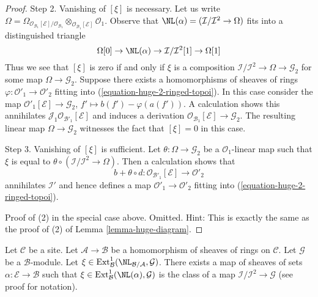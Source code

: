 \begin{proof}
\medskip\noindent
Step 2. Vanishing of $[\xi]$ is necessary. Let us write $\Omega =
\Omega_{\mathcal{O}_{\mathcal{B}_1}[\mathcal{E}]/\mathcal{O}_{\mathcal{B}_1}}
\otimes_{\mathcal{O}_{\mathcal{B}_1}[\mathcal{E}]} \mathcal{O}_1$.
Observe that $\NL(\alpha) = (\mathcal{I}/\mathcal{I}^2 \to \Omega)$
fits into a distinguished triangle
$$
\Omega[0] \to
\NL(\alpha) \to
\mathcal{I}/\mathcal{I}^2[1] \to
\Omega[1]
$$
Thus we see that $[\xi]$ is zero if and only if $\xi$
is a composition $\mathcal{I}/\mathcal{I}^2 \to \Omega \to \mathcal{G}_2$
for some map $\Omega \to \mathcal{G}_2$. Suppose there exists a
homomorphisms of sheaves of rings
$\varphi : \mathcal{O}'_1 \to \mathcal{O}'_2$ fitting into
(\ref{equation-huge-2-ringed-topoi}). In this case consider the map
$\mathcal{O}'_1[\mathcal{E}] \to \mathcal{G}_2$,
$f' \mapsto b(f') - \varphi(a(f'))$. A calculation
shows this annihilates $\mathcal{J}_1\mathcal{O}_{\mathcal{B}'_1}[\mathcal{E}]$
and induces a derivation
$\mathcal{O}_{\mathcal{B}_1}[\mathcal{E}] \to \mathcal{G}_2$.
The resulting linear map $\Omega \to \mathcal{G}_2$ witnesses the
fact that $[\xi] = 0$ in this case.

\medskip\noindent
Step 3. Vanishing of $[\xi]$ is sufficient. Let
$\theta : \Omega \to \mathcal{G}_2$ be a $\mathcal{O}_1$-linear map
such that $\xi$ is equal to
$\theta \circ (\mathcal{I}/\mathcal{I}^2 \to \Omega)$.
Then a calculation shows that
$$
b + \theta \circ d :
\mathcal{O}_{\mathcal{B}'_1}[\mathcal{E}]
\longrightarrow
\mathcal{O}'_2
$$
annihilates $\mathcal{I}'$ and hence defines a map
$\mathcal{O}'_1 \to \mathcal{O}'_2$ fitting into
(\ref{equation-huge-2-ringed-topoi}).

\medskip\noindent
Proof of (2) in the special case above. Omitted. Hint:
This is exactly the same as the proof of (2) of
Lemma \ref{lemma-huge-diagram}.
\end{proof}

\begin{lemma}
\label{lemma-NL-represent-ext-class-ringed-topoi}
Let $\mathcal{C}$ be a site. Let $\mathcal{A} \to \mathcal{B}$ be a
homomorphism of sheaves of rings on $\mathcal{C}$.
Let $\mathcal{G}$ be a $\mathcal{B}$-module.
Let
$\xi \in \text{Ext}^1_\mathcal{B}(\NL_{\mathcal{B}/\mathcal{A}}, \mathcal{G})$. 
There exists a map of sheaves of sets $\alpha : \mathcal{E} \to \mathcal{B}$
such that $\xi \in \text{Ext}^1_\mathcal{B}(\NL(\alpha), \mathcal{G})$
is the class of a map $\mathcal{I}/\mathcal{I}^2 \to \mathcal{G}$
(see proof for notation).
\end{lemma}

